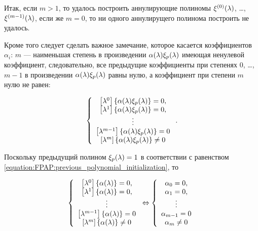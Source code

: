 Итак, если $m > 1$, то удалось построить аннулирующие полиномы $\xi^{(0)} (\lambda)$, \dots, $\xi^{(m-1)} (\lambda)$, если же $m=0$, то ни
одного аннулирущего полинома построить не удалось.

Кроме того следует сделать важное замечание, которое касается коэффициентов $\alpha_i$: $m$ --- наименьшая степень в произведении
$\alpha (\lambda) \xi_p (\lambda)$ имеющая ненулевой коэффициент, следовательно, все предыдущие коэффициенты при
степенях 0, \dots, $m-1$ в произведении $\alpha (\lambda) \xi_p (\lambda)$ равны нулю, а коэффициент при степени $m$ нулю не равен:

	$$
		\left \{
			\begin{array}{c}
				\left [ \lambda^{0} \right ] \left \{ \alpha (\lambda) \xi_p (\lambda) \right \} = 0, \\
				\left [ \lambda^{1} \right ] \left \{ \alpha (\lambda) \xi_p (\lambda) \right \} = 0, \\
				\vdots \\
				\left [ \lambda^{m-1} \right ] \left \{ \alpha (\lambda) \xi_p (\lambda) \right \} = 0\\
				\left [ \lambda^{m} \right ] \left \{ \alpha (\lambda) \xi_p (\lambda) \right \} \neq 0\\
			\end{array}
		\right .
		.
	$$

Поскольку предыдущий полином $\xi_p (\lambda) = 1$ в соответствии с равенством \eqref{equation:FPAP:previous_polynomial_initialization}, то

	\begin{equation} \label{equation:FPAP:first_m_alpha_coefficients}
		\left \{
			\begin{array}{c}
				\left [ \lambda^{0} \right ] \left \{ \alpha (\lambda) \right \} = 0, \\
				\left [ \lambda^{1} \right ] \left \{ \alpha (\lambda) \right \} = 0, \\
				\vdots \\
				\left [ \lambda^{m-1} \right ] \left \{ \alpha (\lambda) \right \} = 0\\
				\left [ \lambda^{m} \right ] \left \{ \alpha (\lambda) \right \} \neq 0\\
			\end{array}
		\right .
		\Leftrightarrow
		\left \{
			\begin{array}{c}
				\alpha_0 = 0, \\
				\alpha_1 = 0, \\
				\vdots \\
				\alpha_{m-1} = 0\\
				\alpha_{m} \neq 0\\
			\end{array}
		\right .
	\end{equation}

